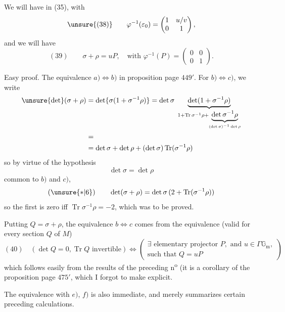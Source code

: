 
We will have in (35), with
\[
\unsure{(38)}\qquad\varphi^{-1}(\varepsilon_0)=\begin{pmatrix}1&u/v\\0&1\end{pmatrix},
\]
and we will have
\[
(39)\qquad\sigma+\rho=uP,\quad\text{with }\varphi^{-1}(P)=\begin{pmatrix}0&0\\0&1\end{pmatrix}.
\]

Easy proof. The equivalence $a)\Leftrightarrow b)$  in proposition page $449'$. For $b)\Leftrightarrow c)$, we write
\[
\begin{aligned}
\unsure{\det}(\sigma+\rho)
&=\det\{\sigma(1+\sigma^{-1}\rho)\}
=\det\sigma\;\underbrace{\det(1+\sigma^{-1}\rho)}_{1+\operatorname{Tr}\sigma^{-1}\rho+\underbrace{\det\sigma^{-1}\rho}_{(\det\sigma)^{-1}\det\rho}}\\
&=\\
&=\det\sigma+\det\rho+(\det\sigma)\operatorname{Tr}(\sigma^{-1}\rho)
\end{aligned}
\]
so by virtue of the hypothesis
\[
\det\sigma=\det\rho
\]
common to $b)$ and $c)$, 
\[
(\unsure{*|6})\qquad\det(\sigma+\rho)=\det\sigma\,(2+\operatorname{Tr}(\sigma^{-1}\rho))
\]
so the first  is zero iff $\operatorname{Tr}\sigma^{-1}\rho=-2$, which was to be proved.



Putting $Q=\sigma+\rho$, the equivalence $b\Leftrightarrow c$ comes from the equivalence (valid for every section $Q$ of $M$)
\[
(40)\quad (\det Q=0,\operatorname{Tr}Q\text{ invertible})\Longleftrightarrow
\left(\begin{gathered}\exists\text{ elementary projector }P,\text{ and }u\in\Gamma\mathbb G_{\mathrm m},\\
\text{such that }Q=uP\end{gathered}\right)
\]
which follows easily from the results of the preceding n\textsuperscript{o} (it is a corollary of the proposition page $475'$, which I forgot to make explicit.

The equivalence with $e)$, $f)$ is also immediate,  and merely summarizes certain preceding calculations.


